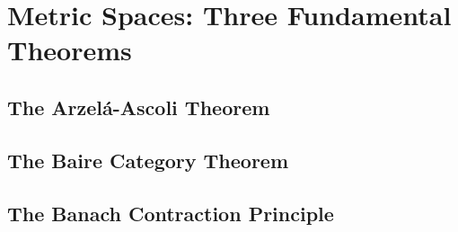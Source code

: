 
\chapter{Metric Spaces: Three Fundamental Theorems}

\section{The Arzel\'a-Ascoli Theorem}
\section{The Baire Category Theorem}
\section{The Banach Contraction Principle}
